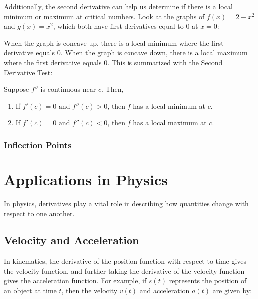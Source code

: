 Additionally, the second derivative can help us determine if there is a local minimum or maximum at critical numbers. Look at the graphs of $f(x) = 2-x^2$ and $g(x) = x^2$, which both have first derivatives equal to $0$ at $x=0$:
\begin{figure}
\centering
{}
\end{figure}

When the graph is concave up, there is a local minimum where the first derivative equals $0$. When the graph is concave down, there is a local maximum where the first derivative equals $0$. This is summarized with the Second Derivative Test:

Suppose $f''$ is continuous near $c$. Then,
\begin{enumerate}
\item If $f'(c) = 0 \text{ and } f''(c)>0$, then $f$ has a local minimum at $c$.
\item If $f'(c) =0 \text{ and } f''(c)<0$, then $f$ has a local maximum at $c$. 
\end{enumerate}

\subsubsection{Inflection Points}

\section{Applications in Physics}

In physics, derivatives play a vital role in describing how quantities
change with respect to one another.

\subsection{Velocity and Acceleration}

In kinematics, the derivative of the position function with respect to
time gives the velocity function, and further taking the derivative of
the velocity function gives the acceleration function. For example, if
$s(t)$ represents the position of an object at time $t$, then the
velocity $v(t)$ and acceleration $a(t)$ are given by:

